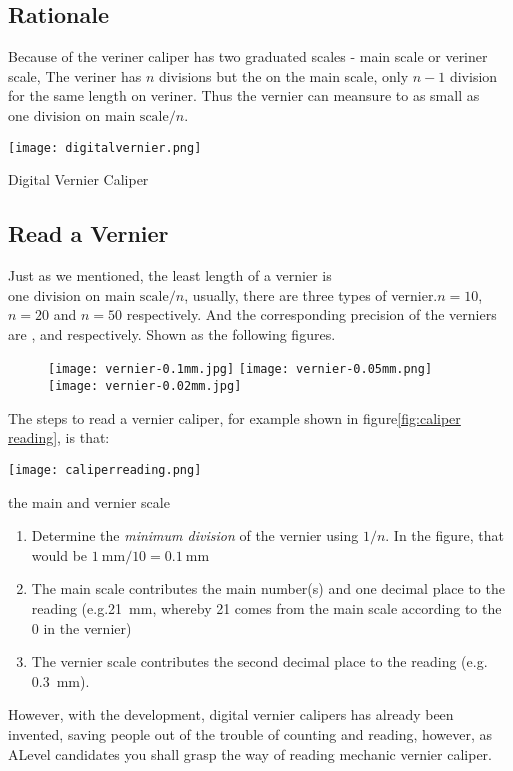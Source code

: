 \documentclass[a4paper]{tufte-handout}
\begin{document}
\subsection{Rationale} %
Because of the veriner caliper has two graduated scales - main scale or veriner scale, The veriner has $n$ divisions but the on the main scale, only $n-1$ division for the same length on veriner. Thus the vernier can meansure to as small as $\text{one division on main scale}/n$. 

\begin{marginfigure}
\texttt{[image: digitalvernier.png]}
\caption{Digital Vernier Caliper}
\end{marginfigure}


\subsection{Read a Vernier}
Just as we mentioned, the least length of a vernier is $\text{one division on main scale}/n$, usually, there are three types of vernier.$n=10$, $n=20$ and $n=50$ respectively. And the corresponding precision of the verniers are \uline{\hspace{0.5 in}}, \uline{\hspace{0.5 in}} and \uline{\hspace{0.5 in}} respectively. 
Shown as the following figures.
\begin{figure}[h]
\texttt{[image: vernier-0.1mm.jpg]}
\texttt{[image: vernier-0.05mm.png]}
\texttt{[image: vernier-0.02mm.jpg]}
\end{figure}

The steps to read a vernier caliper, for example shown in figure\ref{fig:caliper reading}, is that:
\begin{marginfigure}
\texttt{[image: caliperreading.png]}
\caption{the main and vernier scale}
\label{fig:caliper reading}
\end{marginfigure}

\begin{enumerate}
  \item Determine the \emph{minimum division} of the vernier using $1/n$. In the figure, that would be $\SI{1}{\mm}/10 =\SI{0.1}{\mm}$
  \item The main scale contributes the main number(s) and one decimal place to the reading (e.g.\SI{21}{\mm}, whereby 21 comes from the main scale according to the 0 in the vernier)
  \item The vernier scale contributes the second decimal place to the reading (e.g. \SI{0.3}{\mm}).
\end{enumerate}
However, with the development, digital vernier calipers has already been invented, saving people out of the trouble of counting and reading, however, as ALevel candidates you shall grasp the way of reading mechanic vernier caliper.
\end{document}
